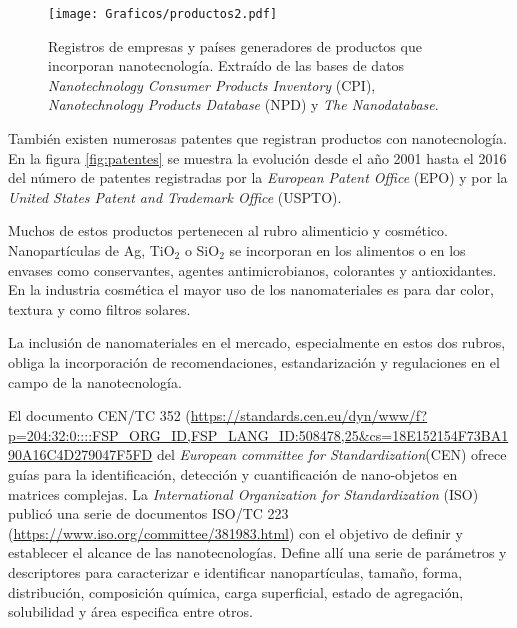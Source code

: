 		\begin{figure}[ht!]
 			\begin{center}
 			\texttt{[image: Graficos/productos2.pdf]}
 			\caption[Cantidad de productos, compañías y origen con base nanotecnologica]{Registros de empresas y países generadores de productos que incorporan nanotecnología. Extraído de las bases de datos \textit{Nanotechnology Consumer Products Inventory} (CPI), \textit{Nanotechnology Products Database} (NPD) y \textit{The Nanodatabase}.}
 			\label{fig:productos}
 		    \end{center}
 		    \end{figure}

 	 También existen numerosas patentes que registran productos con nanotecnología. En la figura \ref{fig:patentes} se muestra la evolución desde el año 2001 hasta el 2016 del número de patentes registradas por la \textit{European Patent Office} (EPO) y por la \textit{United States Patent and Trademark Office} (USPTO).

     Muchos de estos productos pertenecen al rubro alimenticio y cosmético. Nanopartículas de Ag, TiO$_2$ o SiO$_2$ se incorporan en los alimentos o en los envases como conservantes, agentes antimicrobianos, colorantes y antioxidantes. En la industria cosmética el mayor uso de los nanomateriales es para dar color, textura y como filtros solares.
 	
 	 La inclusión de nanomateriales en el mercado, especialmente en estos dos rubros, obliga la incorporación de recomendaciones, estandarización y regulaciones en el campo de la nanotecnología.  

 	 El\hspace{1pt} documento\hspace{1pt} CEN/TC\hspace{1pt} 352 (\url{https://standards.cen.eu/dyn/www/f?p=204:32:0::::FSP_ORG_ID,FSP_LANG_ID:508478,25&cs=18E152154F73BA190A16C4D279047F5FD}
 	 del \textit{European committee for Standardization}(CEN) ofrece guías para la identificación, detección y cuantificación de nano-objetos en matrices complejas. La \textit{International Organization for Standardization} (ISO) publicó una serie de documentos ISO/TC 223 (\url{https://www.iso.org/committee/381983.html}) con el objetivo de definir y establecer el alcance de las nanotecnologías. Define allí una serie de parámetros y descriptores para caracterizar e identificar nanopartículas, tamaño, forma, distribución, composición química, carga superficial, estado de agregación, solubilidad y área especifica entre otros.

